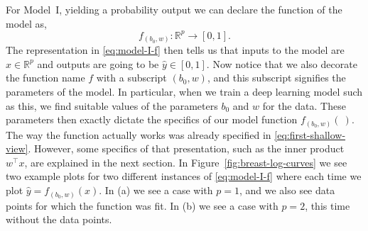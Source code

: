 \documentclass[12pt]{article}
\begin{document}
For Model~I, yielding a probability output we can declare the function of the model as,
%
\begin{equation}
\label{eq:model-I-f}
f_{(b_0,w)}: {\mathbb R}^p \to [0,1].
\end{equation}
%
The representation in \eqref{eq:model-I-f} then tells us that inputs to the model are $x \in {\mathbb R}^p$ and outputs are going to be $\hat{y} \in [0,1]$. Now notice that we also decorate the function name $f$ with a subscript $(b_0,w)$, and this subscript signifies the parameters of the model. In particular, when we train a deep learning model such as this, we find suitable values of the parameters $b_0$ and $w$ for the data. These parameters then exactly dictate the specifics of our model function $f_{(b_0,w)}(~)$. The way the function actually works was already specified in \eqref{eq:first-shallow-view}. However, some specifics of that presentation, such as the inner product $w^\top x$, are explained in the next section. In Figure~\ref{fig:breast-log-curves} we see two example plots for two different instances of \eqref{eq:model-I-f} where each time we plot $\hat{y} = f_{(b_0,w)}(x)$. In (a) we see a case with $p=1$, and we also see data points for which the function was fit. In (b) we see a case with $p=2$, this time without the data points. 
\end{document}
